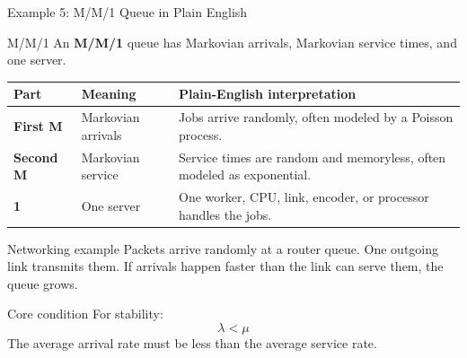 \documentclass[aspectratio=169]{beamer}
\begin{document}
\begin{frame}{Example 5: M/M/1 Queue in Plain English}
\tiny

\begin{block}{M/M/1}
An \textbf{M/M/1} queue has Markovian arrivals, Markovian service times, and one server.
\end{block}

\vspace{0.15cm}

\begin{center}
\begin{tabular}{p{2.0cm} p{3.0cm} p{5.8cm}}
\toprule
\textbf{Part} & \textbf{Meaning} & \textbf{Plain-English interpretation} \\
\midrule
\textbf{First M} & Markovian arrivals & Jobs arrive randomly, often modeled by a Poisson process. \\
\textbf{Second M} & Markovian service & Service times are random and memoryless, often modeled as exponential. \\
\textbf{1} & One server & One worker, CPU, link, encoder, or processor handles the jobs. \\
\bottomrule
\end{tabular}
\end{center}

\vspace{0.2cm}

\begin{exampleblock}{Networking example}
Packets arrive randomly at a router queue. One outgoing link transmits them.  
If arrivals happen faster than the link can serve them, the queue grows.
\end{exampleblock}

\vspace{0.15cm}

\begin{alertblock}{Core condition}
For stability:
\[
\lambda < \mu
\]
The average arrival rate must be less than the average service rate.
\end{alertblock}

\end{frame}
\end{document}
